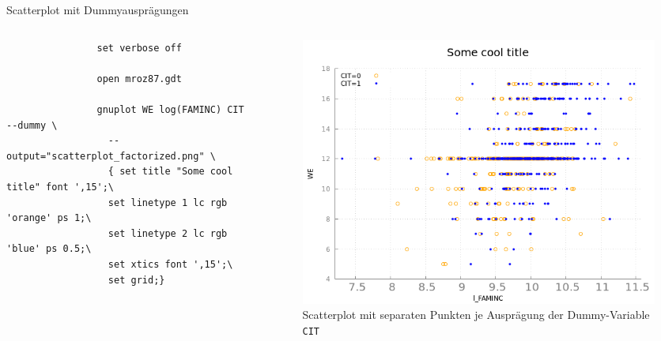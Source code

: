 \documentclass{beamer}[11pt]
\begin{document}
\begin{frame}[fragile]{Scatterplot mit Dummyausprägungen}
	\begin{columns}[T] %
		\tiny
		\begin{column}{.4\textwidth}
			\begin{verbatim}
				set verbose off

				open mroz87.gdt

				gnuplot WE log(FAMINC) CIT --dummy \
				  --output="scatterplot_factorized.png" \
				  { set title "Some cool title" font ',15';\
				  set linetype 1 lc rgb 'orange' ps 1;\
				  set linetype 2 lc rgb 'blue' ps 0.5;\
				  set xtics font ',15';\
				  set grid;}
			\end{verbatim}
		\end{column}

		\begin{column}{.6\textwidth}
			\begin{figure}
				\includegraphics[width=1.0\textwidth]{../figures/scatterplot_factorized.png}
				\caption{Scatterplot mit separaten Punkten je Ausprägung der Dummy-Variable \texttt{CIT}}
			\end{figure}
	  \end{column}
	\end{columns}
\end{frame}
\end{document}
